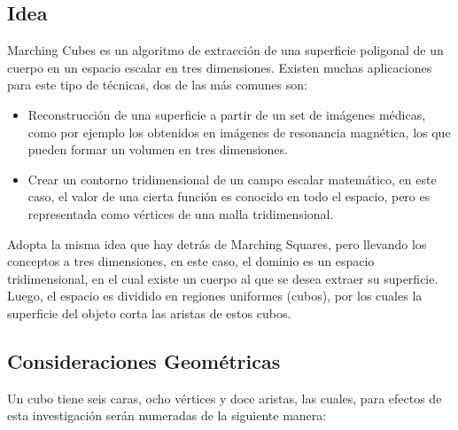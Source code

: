 \subsection{Idea}
\label{subsec:idea}

Marching Cubes es un algoritmo de extracción de una superficie poligonal de un cuerpo 
en un espacio escalar en tres dimensiones. Existen muchas aplicaciones para este tipo de técnicas, 
dos de las más comunes son:

\begin{itemize}
	\item Reconstrucción de una superficie a partir de un set de imágenes médicas, como 
	por ejemplo los obtenidos en imágenes de resonancia magnética, los que pueden formar 
	un volumen en tres dimensiones.

	\item Crear un contorno tridimensional de un campo escalar matemático, en este caso, 
	el valor de una cierta función es conocido en todo el espacio, pero es representada como 
	vértices de una malla tridimensional.
\end{itemize}

Adopta la misma idea que hay detrás de Marching Squares, pero llevando los conceptos a 
tres dimensiones, en este caso, el dominio es un espacio tridimensional, en el cual existe un 
cuerpo al que se desea extraer su superficie. Luego, el espacio es dividido en regiones uniformes 
(cubos), por los cuales la superficie del objeto corta las aristas de estos cubos.

\subsection{Consideraciones Geométricas}
\label{subsec:consideracionesGeometricas}

Un cubo tiene seis caras, ocho vértices y doce aristas, las cuales, para efectos de esta 
investigación serán numeradas de la siguiente manera:

